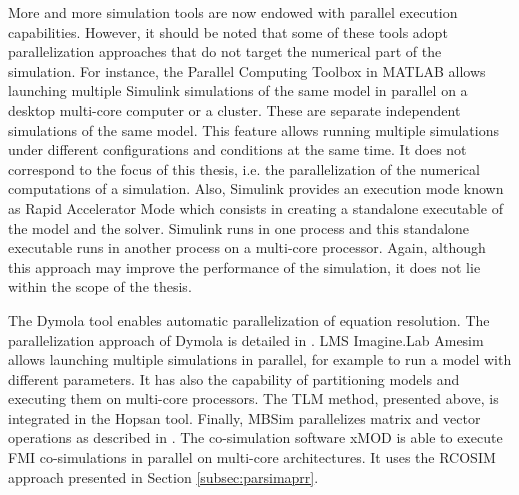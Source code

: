 More and more simulation tools are now endowed with parallel execution capabilities. However, it should be noted that some of these tools adopt parallelization approaches that do not target the numerical part of the simulation. For instance, the Parallel Computing Toolbox in MATLAB allows launching multiple Simulink simulations of the same model in parallel on a desktop multi-core computer or a cluster. These are separate independent simulations of the same model. This feature allows running multiple simulations under different configurations and conditions at the same time. It does not correspond to the focus of this thesis, i.e. the parallelization of the numerical computations of a simulation. Also, Simulink provides an execution mode known as Rapid Accelerator Mode which consists in creating a standalone executable of the model and the solver. Simulink runs in one process and this standalone executable runs in another process on a multi-core processor. Again, although this approach may improve the performance of the simulation, it does not lie within the scope of the thesis.

The Dymola tool enables automatic parallelization of equation resolution. The parallelization approach of Dymola is detailed in \cite{elmqvist:2014}. LMS Imagine.Lab Amesim allows launching multiple simulations in parallel, for example to run a model with different parameters. It has also the capability of partitioning models and executing them on multi-core processors. The TLM method, presented above, is integrated in the Hopsan tool. Finally, MBSim parallelizes matrix and vector operations as described in \cite{clauberg:2012}. The co-simulation software xMOD is able to execute FMI co-simulations in parallel on multi-core architectures. It uses the RCOSIM approach \cite{benkhaled:2014} presented in Section \ref{subsec:parsimaprr}.  
